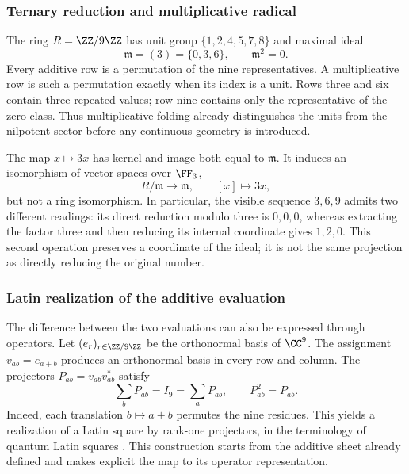 

\subsubsection{Ternary reduction and multiplicative radical}

The ring \(R=\ZZ/9\ZZ\) has unit group \(\{1,2,4,5,7,8\}\) and maximal ideal
\[
 \mathfrak m=(3)=\{0,3,6\},\qquad\mathfrak m^2=0.
\]
Every additive row is a permutation of the nine representatives. A multiplicative row is such a permutation exactly when its index is a unit. Rows three and six contain three repeated values; row nine contains only the representative of the zero class. Thus multiplicative folding already distinguishes the units from the nilpotent sector before any continuous geometry is introduced.

The map \(x\mapsto3x\) has kernel and image both equal to \(\mathfrak m\). It induces an isomorphism of vector spaces over \(\FF_3\),
\[
 R/\mathfrak m\longrightarrow\mathfrak m,\qquad [x]\longmapsto3x,
\]
but not a ring isomorphism. In particular, the visible sequence \(3,6,9\) admits two different readings: its direct reduction modulo three is \(0,0,0\), whereas extracting the factor three and then reducing its internal coordinate gives \(1,2,0\). This second operation preserves a coordinate of the ideal; it is not the same projection as directly reducing the original number.

\subsubsection{Latin realization of the additive evaluation}

The difference between the two evaluations can also be expressed through
operators. Let \((e_r)_{r\in\ZZ/9\ZZ}\) be the orthonormal basis of \(\CC^9\).
The assignment \(v_{ab}=e_{a+b}\) produces an orthonormal basis in every row
and column. The projectors \(P_{ab}=v_{ab}v_{ab}^{*}\) satisfy
\[
 \sum_bP_{ab}=I_9=\sum_aP_{ab},\qquad P_{ab}^2=P_{ab}.
\]
Indeed, each translation \(b\mapsto a+b\) permutes the nine residues.
This yields a realization of a Latin square by rank-one projectors,
in the terminology of quantum Latin squares
\cite{mustovicary,delascuevas2023}. This construction starts from the
additive sheet already defined and makes explicit the map to its operator representation.

